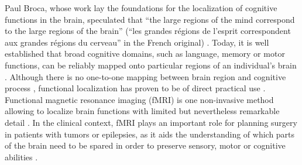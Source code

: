 \documentclass[fleqn,10pt]{SelfArx} %
\begin{document}
Paul Broca, whose work lay the foundations for the localization of cognitive functions in the brain, speculated that “the large regions of the mind correspond to the large regions of the brain” (“les grandes régions de l'esprit correspondent aux grandes régions du cerveau” in the French original) \citep{Broca_1861}. Today, it is well established that broad cognitive domains, such as language, memory or motor functions, can be reliably mapped onto particular regions of an individual's brain \citep{Satterthwaite_2015}. Although there is no one-to-one mapping between brain region and cognitive process  \citep{Cacioppo_2007}, functional localization has proven to be of direct practical use  \citep{Bunzl_2010, Szaflarski_2017}. Functional magnetic resonance imaging (fMRI) is one non-invasive method allowing to localize brain functions with limited but nevertheless remarkable detail \citep{Kanwisher_2017}. In the clinical context, fMRI plays an important role for planning surgery in patients with tumors or epilepsies, as it aids the understanding of which parts of the brain need to be spared in order to preserve sensory, motor or cognitive abilities  \citep{Stippich_2015}.
\end{document}
